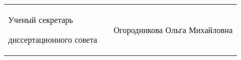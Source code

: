 \vspace{0.008\paperheight plus1fill}

\vspace{0.008\paperheight plus1fill}
\noindent%
\begin{tabularx}{\textwidth}{@{}%
>{\raggedright\arraybackslash}b{18em}@{}
>{\centering\arraybackslash}X
r
@{}}
    Ученый секретарь\par
    диссертационного совета
    &
    &
    Огородникова Ольга Михайловна
\end{tabularx}


\clearpage
